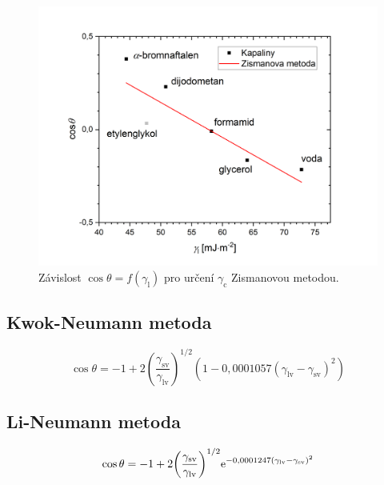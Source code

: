 \documentclass{protokol}
\begin{document}
\begin{figure}[h!]
	\centering
	\includegraphics[width=130mm]{zisman.png}
	\caption{Závislost $\cos\theta = 
		f\left(\gamma_{\text{l}} \right)$ pro určení $\gamma_{\text{c}}$ 
		Zismanovou metodou.}
	\label{graph:zisman}
\end{figure}


\subsection{Kwok-Neumann metoda}
\begin{equation}
	\cos\theta = -1 + 
	2 {\left(\frac{\gamma_{\text{sv}}}{\gamma_{\text{lv}}}\right)}^{1/2} 
	\left(1-0,0001057(\gamma_{\text{lv}} - \gamma_{\text{sv}})^2\right)
\end{equation}
\par 

\subsection{Li-Neumann metoda}
\begin{equation}
	\cos\theta = -1 + 
	2 {\left( \frac{\gamma_{\text{sv}}} {\gamma_{\text{lv}}} \right)}^{1/2} 
	\mathrm{e}^{-0,0001247(\gamma_{\text{lv}} - \gamma_{\text{sv}})^2}
\end{equation}
\par 
\end{document}
